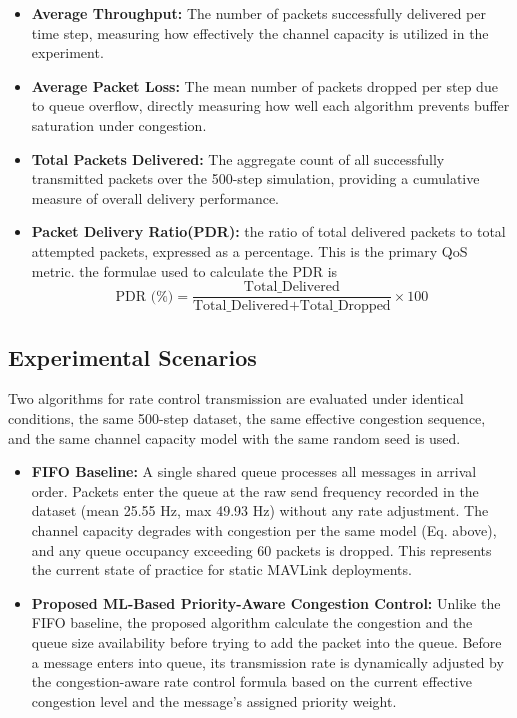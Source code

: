 \documentclass[pdflatex,sn-mathphys-num]{sn-jnl}%
\theoremstyle{thmstyleone}%
\theoremstyle{thmstyletwo}%
\theoremstyle{thmstylethree}%
\begin{document}
\begin{itemize}
    \item \textbf{Average Throughput:} The number of packets successfully delivered per time step, measuring how effectively the channel capacity is utilized in the experiment.
    \\
    \item \textbf{Average Packet Loss:} The mean number of packets dropped per step due to queue overflow, directly measuring how well each algorithm prevents buffer saturation under congestion.
    \\
    \item \textbf{Total Packets Delivered:} The aggregate count of all successfully transmitted packets over the 500-step simulation, providing a cumulative measure of overall delivery performance.
    \\
    \item \textbf{Packet Delivery Ratio(PDR):} the ratio of total delivered packets to total attempted packets, expressed as a percentage. This is the primary QoS metric.
    the formulae used to calculate the PDR is 
    \[
        \text{PDR (\%)} = \frac{\text{Total\_Delivered}}{\text{Total\_Delivered} + \text{Total\_Dropped}} \times 100
    \]
\end{itemize}



\subsection{ Experimental Scenarios }
Two algorithms for rate control transmission are evaluated under identical conditions, the same 500-step dataset, the same effective congestion sequence, and the same channel capacity model with the same random seed is used.

\begin{itemize}
    \item \textbf{FIFO Baseline: }A single shared queue processes all messages in arrival order. Packets enter the queue at the raw send frequency recorded in the dataset (mean 25.55 Hz, max 49.93 Hz) without any rate adjustment. The channel capacity degrades with congestion per the same model (Eq. above), and any queue occupancy exceeding 60 packets is dropped. This represents the current state of practice for static MAVLink deployments.
    \item \textbf{Proposed ML-Based Priority-Aware Congestion Control: }Unlike the FIFO baseline, the proposed algorithm calculate the congestion and the queue size availability before trying to add the packet into the queue. Before a message enters into queue, its transmission rate is dynamically adjusted by the congestion-aware rate control formula based on the current effective congestion level and the message's assigned priority weight.
\end{itemize}
\end{document}
